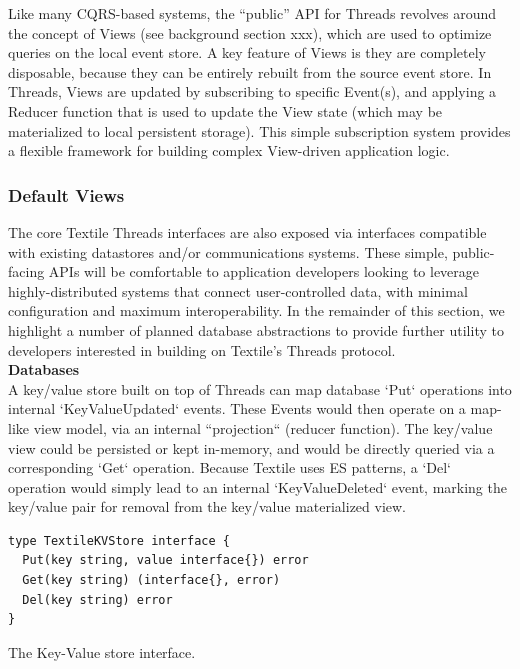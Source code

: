 \documentclass{comjnl}
\begin{document}
Like many CQRS-based systems, the “public” API for Threads revolves around the concept of Views (see background section xxx), which are used to optimize queries on the local event store. A key feature of Views is they are completely disposable, because they can be entirely rebuilt from the source event store. In Threads, Views are updated by subscribing to specific Event(s), and applying a Reducer function that is used to update the View state (which may be materialized to local persistent storage). This simple subscription system provides a flexible framework for building complex View-driven application logic.

\subsubsection{Default Views}

The core Textile Threads interfaces are also exposed via interfaces compatible with existing datastores and/or communications systems. These simple, public-facing APIs will be comfortable to application developers looking to leverage highly-distributed systems that connect user-controlled data, with minimal configuration and maximum interoperability. In the remainder of this section, we highlight a number of planned database abstractions to provide further utility to developers interested in building on Textile’s Threads protocol.\\

\textbf{Databases} \\

A key/value store built on top of Threads can map database `Put` operations into internal `KeyValueUpdated` events. These Events would then operate on a map-like view model, via an internal “projection“ (reducer function). The key/value view could be persisted or kept in-memory, and would be directly queried via a corresponding `Get` operation. Because Textile uses ES patterns, a `Del` operation would simply lead to an internal `KeyValueDeleted` event, marking the key/value pair for removal from the key/value materialized view.

\begin{example}
\begin{minipage}{.45\textwidth}
\begin{lstlisting}
type TextileKVStore interface {
  Put(key string, value interface{}) error
  Get(key string) (interface{}, error)
  Del(key string) error
}
\end{lstlisting}
\end{minipage}
\caption{The Key-Value store interface.}
\end{example} \label{ex:KVStore}
\end{document}
